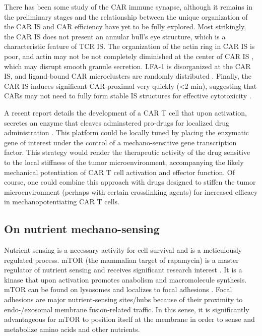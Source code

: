 There has been some study of the CAR immune synapse, although it remains in the preliminary stages and the relationship between the unique organization of the CAR IS and CAR efficiency have yet to be fully explored. Most strikingly, the CAR IS does not present an annular bull's eye structure, which is a characteristic feature of TCR IS.  The organization of the actin ring in CAR IS is poor, and actin may not be not completely diminished at the center of CAR IS \cite{Xiong2018}, which may disrupt smooth granule secretion. LFA-1 is disorganized at the CAR IS, and ligand-bound CAR microclusters are randomly distributed \cite{Davenport2019}. Finally, the CAR IS induces significant CAR-proximal very quickly (\textless 2 min), suggesting that CARs may not need to fully form stable IS structures for effective cytotoxicity \cite{Li2020, Watanabe2018}. 

A recent report details the development of a CAR T cell that upon activation, secretes an enzyme that cleaves adminstered pro-drugs for localized drug administration \cite{Gardner2021}. This platform could be locally tuned by placing the enzymatic gene of interest under the control of a mechano-sensitive gene transcription factor. This strategy would render the therapeutic activity of the drug sensitive to the local stiffness of the tumor microenvironment, accompanying the likely mechanical potentiation of CAR T cell activation and effector function. Of course, one could combine this approach with drugs designed to stiffen the tumor microenvironment (perhaps with certain crosslinking agents) for increased efficacy in mechanopotentiating CAR T cells. 

\subsection{On nutrient mechano-sensing}

Nutrient sensing is a necessary activity for cell survival and is a meticulously regulated process. mTOR (the mammalian target of rapamycin) is a master regulator of nutrient sensing and receives significant research interest \cite{Park2020}. It is a kinase that upon activation promotes anabolism and macromolecule synthesis. mTOR can be found on lysosomes \cite{Rabanal-Ruiz2018} and localizes to focal adhesions \cite{Rabanal-Ruiz2018}. Focal adhesions are major nutrient-sensing sites/hubs \cite{Hamidi2021} because of their proximity to  endo-/exosomal membrane fusion-related traffic. In this sense, it is significantly advantageous for mTOR to position itself at the membrane in order to sense and metabolize amino acids \cite{Shimobayashi2016} and other nutrients.

